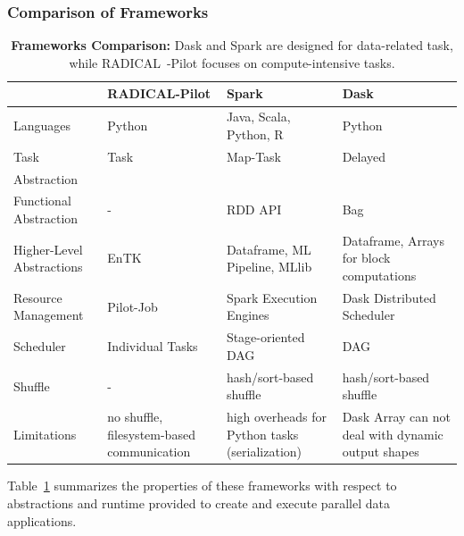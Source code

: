 \subsubsection{Comparison of Frameworks}
\begin{table}[t]
    \begin{tabular}{@{}p{2.75cm}|p{3.25cm}p{3.25cm}p{3.25cm}@{}}
        \toprule
        &\textbf{RADICAL-Pilot} &
        \textbf{Spark} &
        \textbf{Dask} \\
        \midrule
        Languages &
        Python &
        Java, Scala, Python, R &
        Python\\
        Task &
        Task &
        Map-Task &
        Delayed\\
        Abstraction &
        &
        & \\
        Functional Abstraction  &
        - &
        RDD API &
        Bag\\
        Higher-Level Abstractions &
        EnTK~\cite{balasubramanian2018harnessing} &
        Dataframe, ML Pipeline, MLlib~\cite{meng2016mllib} &
        Dataframe, Arrays for block computations\\
        Resource Management &
        Pilot-Job &
        Spark Execution Engines &
        Dask Distributed Scheduler\\
        Scheduler    &
        Individual Tasks &
        Stage-oriented DAG &
        DAG\\
        Shuffle      &
        -       &
        hash/sort-based shuffle &
        hash/sort-based shuffle\\
        Limitations &
        no shuffle, filesystem-based communication  &
        high overheads for Python tasks (serialization)   &
        Dask Array can not deal with dynamic output shapes\\
        \bottomrule
    \end{tabular}
    \caption{\textbf{Frameworks Comparison:} Dask and Spark are designed for data-related task, while RADICAL~-Pilot focuses on compute-intensive tasks.\label{tab:frameworks}}
\end{table}

Table~\ref{tab:frameworks} summarizes the properties of these frameworks with respect to abstractions and runtime provided to create and execute parallel data applications. 


